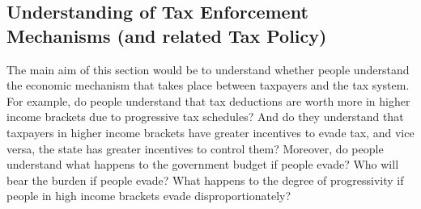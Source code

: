\documentclass[a4paper, 12pt]{article}
\begin{document}
\subsection{Understanding of Tax Enforcement Mechanisms (and related Tax Policy)}
The main aim of this section would be to understand whether people understand the economic mechanism that takes place between taxpayers and the tax system. For example, do people understand that tax deductions are worth more in higher income brackets due to progressive tax schedules? And do they understand that taxpayers in higher income brackets have greater incentives to evade tax, and vice versa, the state has greater incentives to control them? Moreover, do people understand what happens to the government budget if people evade? Who will bear the burden if people evade? What happens to the degree of progressivity if people in high income brackets evade disproportionately? 
\end{document}
